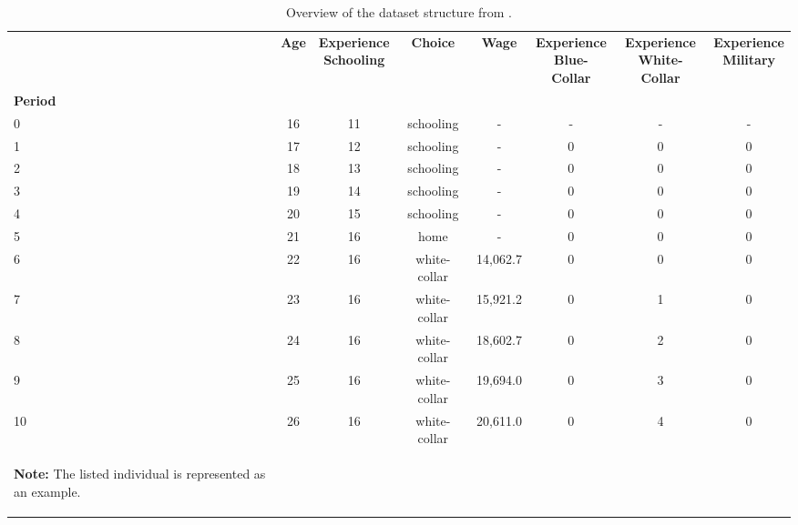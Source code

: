 \begin{ThreePartTable}

	\begin{longtable}{@{}lccccccc@{}}
		\caption{Overview of the dataset structure from \citet{Keane.1997}.}
		\label{tab:BasicDataStructure}
		
		\setlength\extrarowheight{2.5pt}
		
		\\
		\toprule
       & \textbf{Age}    & \thead{\textbf{Experience}\\ \textbf{Schooling}}  & \textbf{Choice} & \textbf{Wage} & \thead{\textbf{Experience}\\ \textbf{Blue-Collar}} & \thead{\textbf{Experience}\\ \textbf{White-Collar}} & \thead{\textbf{Experience}\\ \textbf{Military}}   \\
\textbf{Period} &        &            &        &      &             &               &       \\ \midrule
		\endfirsthead
		
0  & 16 & 11 & schooling    & - & - & - & -\\
1  & 17 & 12 & schooling    & - & 0 & 0 & 0\\
2  & 18 & 13 & schooling    & - & 0 & 0 & 0\\
3  & 19 & 14 & schooling    & - & 0 & 0 & 0\\
4  & 20 & 15 & schooling    & - & 0 & 0 & 0\\
5  & 21 & 16 & home         & - & 0 & 0 & 0\\
6  & 22 & 16 & white-collar & 14,062.7 & 0 & 0 & 0\\
7  & 23 & 16 & white-collar & 15,921.2 & 0 & 1 & 0\\
8  & 24 & 16 & white-collar & 18,602.7 & 0 & 2 & 0\\
9  & 25 & 16 & white-collar & 19,694.0 & 0 & 3 & 0\\
10 & 26 & 16 & white-collar & 20,611.0 & 0 & 4 & 0\\
  \bottomrule
	\begin{TableNotes}
		\item \textbf{Note:} The listed individual is represented as an example. 
	\end{TableNotes}		
	\end{longtable}
\end{ThreePartTable}
